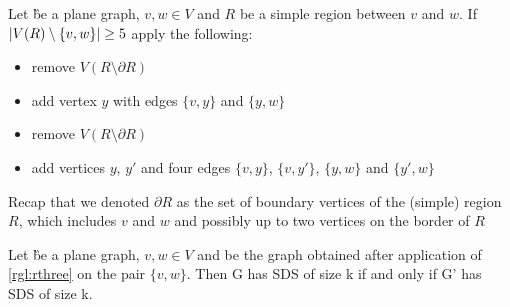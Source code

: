 \begin{rgl}\label{rgl:rthree}
    Let \G be a plane graph, $v, w \in V$ and $R$ be a simple region between $v$ and $w$. If $\abs{V(R) \setminus \{v, w\}} \geq 5$ apply the following:

    \begin{caseof}

            \vspace{-5mm}
            \begin{itemize}
                    \item remove $V(R\setminus\partial R)$
                    \item add vertex $y$ with edges $\{v, y\}$ and $\{y, w\}$
            \end{itemize}

            \vspace{-5mm}
            \begin{itemize}
                    \item remove $V(R\setminus\partial R)$
                    \item add vertices $y$, $y'$ and four edges $\{v,y\}$, $\{v, y'\}$, $\{y, w\}$ and $\{y', w\}$
            \end{itemize}
        \end{caseof}
Recap that we denoted $\partial R$ as the set of boundary vertices of the (simple) region $R$, which includes $v$ and $w$ and possibly up to two vertices on the border of $R$

\end{rgl}
\begin{lemma}\label{lemma:correctnessthree}
    Let \G be a plane graph, $v, w \in V$ and \GB be the graph obtained after application of \cref{rgl:rthree} on the pair $\{v, w\}$. Then G has SDS of size k if and only if G' has SDS of size k.
\end{lemma}
